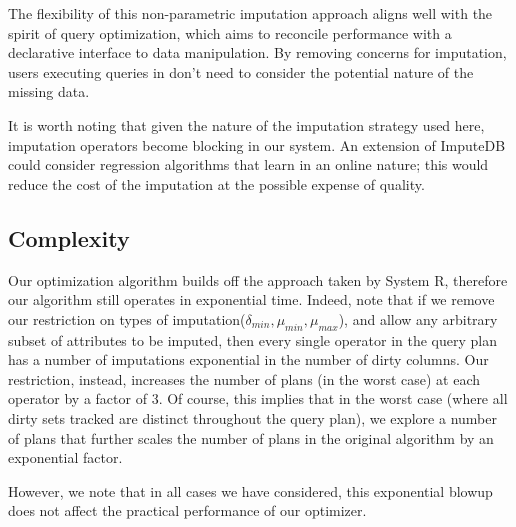 The flexibility of this non-parametric imputation approach aligns well with the spirit of
query optimization, which aims to reconcile performance with a declarative interface to data
manipulation. By removing concerns for imputation, users executing queries in \ProjectName{}
don't need to consider the potential nature of the missing data.

It is worth noting that given the nature of the imputation strategy used here, imputation
operators become blocking in our system. An extension of ImputeDB could consider regression
algorithms that learn in an online nature; this would reduce the cost of the imputation at
the possible expense of quality.

\begin{algorithm}
    
\end{algorithm}

\subsection{Complexity}
Our optimization algorithm builds off the approach taken by System R\cite{blasgen1981system}, therefore our algorithm still operates in exponential time. Indeed, 
note that if we remove our restriction on types of imputation($\delta_{min}, \mu_{min}, \mu_{max}$), and allow any arbitrary subset of attributes to be imputed,
then every single operator in the query plan has a number of imputations exponential in the number of dirty columns. Our restriction, instead, increases the number
of plans (in the worst case) at each operator by a factor of 3. Of course, this implies that in the worst case (where all dirty sets tracked are distinct throughout the query plan),
we explore a number of plans that further scales the number of plans in the original algorithm by an exponential factor.

However, we note that in all cases we have considered, this exponential blowup does not affect the practical performance of our optimizer.

